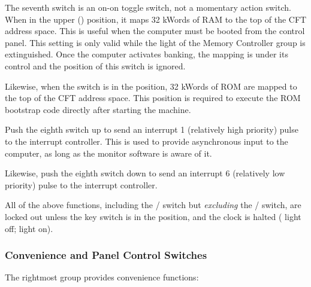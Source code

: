 \begin{description}
\item{\bfseries{}} The seventh switch is an on-on toggle switch,
  not a momentary action switch. When in the upper ()
  position, it maps 32 kWords of RAM to the top of the CFT address
  space. This is useful when the computer must be booted from the
  control panel. This setting is only valid while the 
  light of the Memory Controller group is extinguished. Once the
  computer activates banking, the mapping is under its control and the
  position of this switch is ignored.
\item{\bfseries{}} Likewise, when the switch is in the  position, 32 kWords of ROM are mapped to the top of the CFT
  address space. This position is required to execute the ROM
  bootstrap code directly after starting the machine.

\item{\bfseries{}} Push the eighth switch up to send an interrupt 1
  (relatively high priority) pulse to the interrupt controller. This
  is used to provide asynchronous input to the computer, as long as
  the monitor software is aware of it.
\item{\bfseries{}} Likewise, push the eighth switch down to send an
  interrupt 6 (relatively low priority) pulse to the interrupt
  controller.

\end{description}

All of the above functions, including the {/}
switch but {\em excluding\/} the / switch, are
locked out unless the key switch is in the  position, and
the clock is halted ( light off;  light on).

\subsubsection{Convenience and Panel Control Switches}

The rightmost group provides convenience functions:


